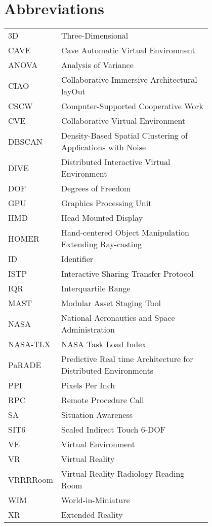 \chapter*{Abbreviations}

\begin{flushleft}
\begin{tabular}{l p{0.8\linewidth}}
3D      & Three-Dimensional \\
CAVE    & Cave Automatic Virtual Environment \\
ANOVA   & Analysis of Variance \\
CIAO    & Collaborative Immersive Architectural layOut \\
CSCW    & Computer-Supported Cooperative Work \\
CVE     & Collaborative Virtual Environment \\
DBSCAN  & Density-Based Spatial Clustering of Applications with Noise \\
DIVE    & Distributed Interactive Virtual Environment \\
DOF     & Degrees of Freedom \\
GPU     & Graphics Processing Unit \\
HMD     & Head Mounted Display \\
HOMER   & Hand-centered Object Manipulation Extending Ray-casting \\
ID      & Identifier \\
ISTP    & Interactive Sharing Transfer Protocol \\
IQR     & Interquartile Range \\
MAST    & Modular Asset Staging Tool \\
NASA    & National Aeronautics and Space Administration \\
NASA-TLX & NASA Task Load Index \\
PaRADE  & Predictive Real time Architecture for Distributed Environments \\
PPI     & Pixels Per Inch \\
RPC     & Remote Procedure Call \\
SA      & Situation Awareness \\
SIT6    & Scaled Indirect Touch 6-DOF \\
VE      & Virtual Environment \\
VR      & Virtual Reality \\
VRRRRoom & Virtual Reality Radiology Reading Room \\
WIM     & World-in-Miniature \\
XR      & Extended Reality \\
\end{tabular}
\end{flushleft}

